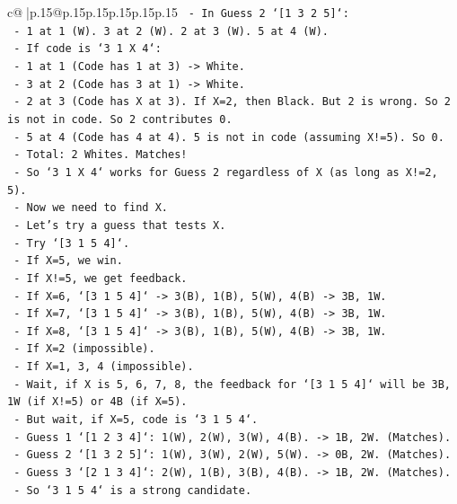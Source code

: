 \documentclass{article}
\begin{document}
{\begin{supertabular}{c@{$\;$}|p{.15\linewidth}@{}p{.15\linewidth}p{.15\linewidth}p{.15\linewidth}p{.15\linewidth}p{.15\linewidth}}
{{{\texttt{  {-} In Guess 2 `{[}1 3 2 5{]}`:} \\
\texttt{    {-} 1 at 1 (W). 3 at 2 (W). 2 at 3 (W). 5 at 4 (W).} \\
\texttt{    {-} If code is `3 1 X 4`:} \\
\texttt{      {-} 1 at 1 (Code has 1 at 3) {-}> White.} \\
\texttt{      {-} 3 at 2 (Code has 3 at 1) {-}> White.} \\
\texttt{      {-} 2 at 3 (Code has X at 3). If X=2, then Black. But 2 is wrong. So 2 is not in code. So 2 contributes 0.} \\
\texttt{      {-} 5 at 4 (Code has 4 at 4). 5 is not in code (assuming X!=5). So 0.} \\
\texttt{      {-} Total: 2 Whites. Matches!} \\
\texttt{  {-} So `3 1 X 4` works for Guess 2 regardless of X (as long as X!=2, 5).} \\
\texttt{  {-} Now we need to find X.} \\
\texttt{  {-} Let's try a guess that tests X.} \\
\texttt{  {-} Try `{[}3 1 5 4{]}`.} \\
\texttt{    {-} If X=5, we win.} \\
\texttt{    {-} If X!=5, we get feedback.} \\
\texttt{    {-} If X=6, `{[}3 1 5 4{]}` {-}> 3(B), 1(B), 5(W), 4(B) {-}> 3B, 1W.} \\
\texttt{    {-} If X=7, `{[}3 1 5 4{]}` {-}> 3(B), 1(B), 5(W), 4(B) {-}> 3B, 1W.} \\
\texttt{    {-} If X=8, `{[}3 1 5 4{]}` {-}> 3(B), 1(B), 5(W), 4(B) {-}> 3B, 1W.} \\
\texttt{    {-} If X=2 (impossible).} \\
\texttt{    {-} If X=1, 3, 4 (impossible).} \\
\texttt{  {-} Wait, if X is 5, 6, 7, 8, the feedback for `{[}3 1 5 4{]}` will be 3B, 1W (if X!=5) or 4B (if X=5).} \\
\texttt{  {-} But wait, if X=5, code is `3 1 5 4`.} \\
\texttt{    {-} Guess 1 `{[}1 2 3 4{]}`: 1(W), 2(W), 3(W), 4(B). {-}> 1B, 2W. (Matches).} \\
\texttt{    {-} Guess 2 `{[}1 3 2 5{]}`: 1(W), 3(W), 2(W), 5(W). {-}> 0B, 2W. (Matches).} \\
\texttt{    {-} Guess 3 `{[}2 1 3 4{]}`: 2(W), 1(B), 3(B), 4(B). {-}> 1B, 2W. (Matches).} \\
\texttt{  {-} So `3 1 5 4` is a strong candidate.} \\
}}}
\end{supertabular}}
\end{document}
